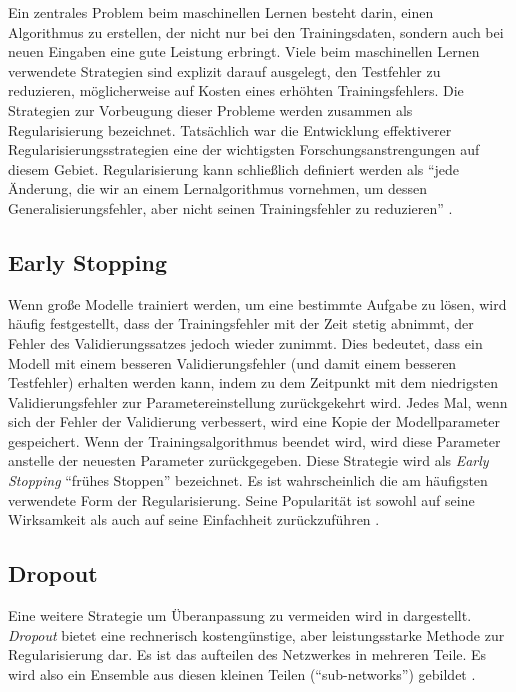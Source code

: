 Ein zentrales Problem beim maschinellen Lernen besteht darin, einen Algorithmus zu erstellen, der nicht nur bei den Trainingsdaten, sondern auch bei neuen Eingaben eine gute Leistung erbringt. Viele beim maschinellen Lernen verwendete Strategien sind explizit darauf ausgelegt, den Testfehler zu reduzieren, möglicherweise auf Kosten eines erhöhten Trainingsfehlers. Die Strategien zur Vorbeugung dieser Probleme werden zusammen als Regularisierung bezeichnet. Tatsächlich war die Entwicklung effektiverer Regularisierungsstrategien eine der wichtigsten Forschungsanstrengungen auf diesem Gebiet. Regularisierung kann schließlich definiert werden als \enquote{jede Änderung, die wir an einem Lernalgorithmus vornehmen, um dessen Generalisierungsfehler, aber nicht seinen Trainingsfehler zu reduzieren} \cite*[228]{IanGoodfellowYoshuaBengio2016}.

\subsection{Early Stopping}
Wenn große Modelle trainiert werden, um eine bestimmte Aufgabe zu lösen, wird häufig festgestellt, dass der Trainingsfehler mit der Zeit stetig abnimmt, der Fehler des Validierungssatzes jedoch wieder zunimmt. Dies bedeutet, dass ein Modell mit einem besseren Validierungsfehler (und damit einem besseren Testfehler) erhalten werden kann, indem zu dem Zeitpunkt mit dem niedrigsten Validierungsfehler zur Parametereinstellung zurückgekehrt wird. Jedes Mal, wenn sich der Fehler der Validierung verbessert, wird eine Kopie der Modellparameter gespeichert. Wenn der Trainingsalgorithmus beendet wird, wird diese Parameter anstelle der neuesten Parameter zurückgegeben. Diese Strategie wird als \textit{Early Stopping} \enquote{frühes Stoppen} bezeichnet. Es ist wahrscheinlich die am häufigsten verwendete Form der Regularisierung. Seine Popularität ist sowohl auf seine Wirksamkeit als auch auf seine Einfachheit zurückzuführen \cite*[246]{IanGoodfellowYoshuaBengio2016}.


\subsection{Dropout}
Eine weitere Strategie um Überanpassung zu vermeiden wird in \cite*{Srivastava2014} dargestellt. \textit{Dropout} bietet eine rechnerisch kostengünstige, aber leistungsstarke Methode zur Regularisierung dar. Es ist das aufteilen des Netzwerkes in mehreren Teile. Es wird also ein Ensemble aus diesen kleinen Teilen (\enquote{sub-networks}) gebildet \cite*[258]{IanGoodfellowYoshuaBengio2016}.



